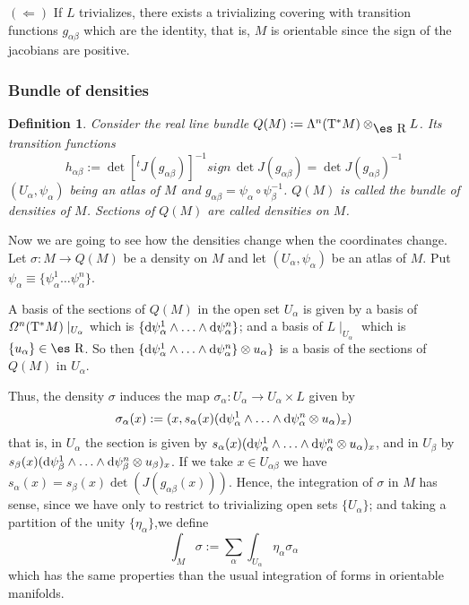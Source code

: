 \documentclass[12pt]{article}
\theoremstyle{plain}
\newtheorem{definition}{Definition}
\def\qed{\ifvmode\removelastskip\fi
{\unskip\nobreak\hfil\penalty50\hbox{}\nobreak\hfil
\hbox{\vrule height1.2ex width1.2ex}\parfillskip=0pt
\finalhyphendemerits=0 \par\smallskip}}
\def\d{{\rm d}}
\def\Real{\mbox{\es R}}
\def\Tan{{\rm T}}
\begin{document}
$(\Longleftarrow)$ \quad
If $L$ trivializes, there exists a trivializing covering with transition
functions
$g_{\alpha \beta}$ which are the identity, that is, $M$ is orientable
since the sign of the jacobians are positive.
\qed


\subsubsection{Bundle of densities}


\begin{definition}
Consider the real line bundle $Q(M) := \Lambda^n(\Tan^* M)
\otimes_{\Real} L$.
Its transition functions
$$
h_{\alpha \beta} :=
\det [^tJ(g_{\alpha \beta})]^{-1} sign\, \det J(g_{\alpha \beta})=
\det J(g_{\alpha \beta})^{-1}
$$
$(U_{\alpha},\psi_{\alpha})$ being an atlas of $M$ and
$g_{\alpha \beta} = \psi_{\alpha} \circ \psi_{\beta}^{-1}$.
$Q(M)$ is called the {\rm bundle of densities} of $M$.
Sections of $Q(M)$ are called {\rm densities} on $M$.
\label{dens}
\end{definition}

Now we are going to see how the densities change
when the coordinates change. Let $\sigma \colon M \to Q(M)$ be a density
on $M$
and let $(U_{\alpha},\psi_{\alpha})$ be an atlas of $M$.
Put $\psi_{\alpha} \equiv \{ \psi_{\alpha}^1 \ldots \psi_{\alpha}^n \}$.

A basis of the sections of $Q(M)$ in the open set $U_{\alpha}$ is given
by
a basis of ${\mit\Omega}^n(\Tan^* M) \mid_{U_{\alpha}}$
which is $\{ \d \psi_{\alpha}^1 \wedge \ldots \wedge \d \psi_{\alpha}^n
\}$;
and a basis of $L \mid_{U_{\alpha}}$ which is $\{ u_{\alpha} \} \in
\Real$.
So then $\{ \d \psi_{\alpha}^1 \wedge \ldots \wedge \d \psi_{\alpha}^n
\}\otimes u_{\alpha} \}$
is a basis of the sections of $Q(M)$ in $U_{\alpha}$.

Thus, the density $\sigma$ induces the map
$\sigma_{\alpha}\colon U_{\alpha} \to U_{\alpha} \times L$
given by
$$
\sigma_{\alpha}(x) :=(x,s_{\alpha}(x)
(\d \psi_{\alpha}^1 \wedge \ldots \wedge \d \psi_{\alpha}^n
\otimes u_{\alpha})_x)
$$
that is, in $U_{\alpha}$ the section is given by
$s_{\alpha}(x) (\d
\psi_{\alpha}^1\wedge\ldots\wedge\d\psi_{\alpha}^n\otimes
u_{\alpha})_x$,
and in $U_{\beta}$ by
 $s_{\beta}(x)(\d \psi_{\beta}^1\wedge
 \ldots\wedge\d\psi_{\beta}^n\otimes u_{\beta})_x$.
If we take $x \in U_{\alpha \beta}$ we have
$s_{\alpha}(x) =s_{\beta}(x) \det (J(g_{\alpha \beta}(x)))$.
Hence, the integration of $\sigma$ in $M$ has sense,
since we have only to restrict to trivializing open sets $\{ U_{\alpha}
\}$;
and taking a partition of the unity $\{ \eta_{\alpha} \}$,we define
$$
\int_M \sigma :=
\sum_{\alpha}\int_{U_{\alpha}} \eta_{\alpha}  \sigma_{\alpha}
$$
which has the same properties than the
usual integration of forms in orientable manifolds.
\end{document}
